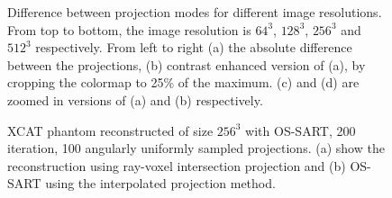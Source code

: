 \begin{figure}

\centering
{}
\caption{\label{fig:projtypesdiff} Difference between projection modes for different image resolutions. From top to bottom, the image resolution is $64^3$, $128^3$, $256^3$ and $512^3$ respectively. From left to right (a) the absolute difference between the projections, (b) contrast enhanced version of (a), by cropping the colormap to 25\% of the maximum. (c) and (d) are zoomed in versions of (a) and (b) respectively.} 
\end{figure}


\begin{figure}
\centering
{}

\caption{\label{fig:OSSART200proj} XCAT phantom reconstructed of size $256^3$ with OS-SART, 200 iteration, 100 angularly uniformly sampled projections. (a) show the reconstruction using ray-voxel intersection projection and (b) OS-SART using the interpolated projection method.} 
\end{figure}


